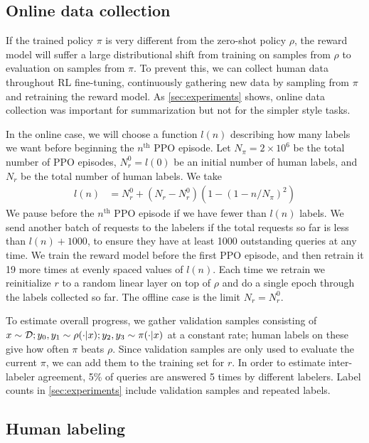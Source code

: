 \documentclass{article}
\begin{document}
\subsection{Online data collection \label{sec:online}}

If the trained policy $\pi$ is very different from the zero-shot policy $\rho$, the reward model will suffer a large distributional shift from training
on samples from $\rho$ to evaluation on samples from $\pi$.
To prevent this, we can collect human data throughout RL fine-tuning, continuously gathering new data by sampling from $\pi$ and retraining the reward model. 
As \cref{sec:experiments} shows, online data collection was important for summarization but not for the simpler style tasks.

In the online case,
we will choose a function $l(n)$ describing how many labels we want
before beginning the $n^{\textrm{th}}$ PPO episode.
Let $N_{\pi} = 2 \times 10^6$ be the total number of PPO episodes,
$N_r^0 = l(0)$ be an initial number of human labels,
and $N_r$ be the total number of human labels.
We take
\begin{align*}
l(n) &= N_r^0 + (N_r - N_r^0) \left(1 - (1 - n/N_\pi)^2\right)
\end{align*}
We pause before the $n^{\textrm{th}}$ PPO episode
if we have fewer than $l(n)$ labels.
We send another batch of requests to the labelers
if the total requests so far is less than $l(n) + 1000$,
to ensure they have at least 1000 outstanding queries at any time.
We train the reward model before the first PPO episode,
and then retrain it 19 more times at evenly spaced
values of $l(n)$.
Each time we retrain we reinitialize $r$ to a random linear layer on top of $\rho$
and do a single
epoch through the labels collected so far.
The offline case is the limit $N_r = N_r^0$.

To estimate overall progress, we gather validation samples consisting of $x \sim \mathcal{D}; y_0,y_1 \sim \rho(\cdot |x); y_2,y_3 \sim \pi(\cdot | x)$ at a constant rate; human labels on these give how often $\pi$ beats $\rho$.  Since validation samples are only used to evaluate the current $\pi$, we can add them to the training set for $r$. 
In order to estimate inter-labeler agreement, 5\% of queries are answered 5 times by different labelers.  Label counts in \cref{sec:experiments} include validation samples and repeated labels.

\subsection{Human labeling}
\end{document}

